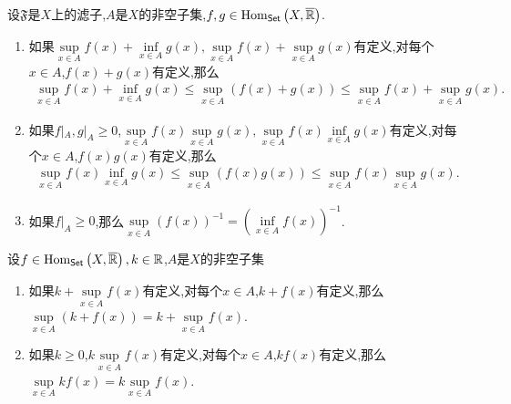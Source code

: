 \begin{proposition}{}{}
	设$\mathfrak{F}$是$X$上的滤子,$A$是$X$的非空子集,$f,g\in\operatorname{Hom}_{\mathsf{Set}}\left(X,\overline{\mathbb{R}}\right)$.
	\begin{enumerate}
		\item 如果$\sup\limits_{x\in A}f\left(x\right)+\inf\limits_{x\in A}g\left(x\right),\sup\limits_{x\in A}f\left(x\right)+\sup\limits_{x\in A}g\left(x\right)$有定义,对每个$x\in A$,$f\left(x\right)+g\left(x\right)$有定义,那么
		\begin{align*}
			\sup\limits_{x\in A}f\left(x\right)+\inf\limits_{x\in A}g\left(x\right)\leq\sup\limits_{x\in A}\left(f\left(x\right)+g\left(x\right)\right)\leq\sup\limits_{x\in A}f\left(x\right)+\sup\limits_{x\in A}g\left(x\right).
		\end{align*}
		\item 如果$f|_{A},g|_{A}\geq 0$,$\sup\limits_{x\in A}f\left(x\right)\sup\limits_{x\in A}g\left(x\right),\sup\limits_{x\in A}f\left(x\right)\inf\limits_{x\in A}g\left(x\right)$有定义,对每个$x\in A$,$f\left(x\right)g\left(x\right)$有定义,那么
		\begin{align*}
			\sup\limits_{x\in A}f\left(x\right)\inf\limits_{x\in A}g\left(x\right)\leq\sup\limits_{x\in A}\left(f\left(x\right)g\left(x\right)\right)\leq\sup\limits_{x\in A}f\left(x\right)\sup\limits_{x\in A}g\left(x\right).
		\end{align*}
		\item 如果$f|_{A}\geq 0$,那么$\sup\limits_{x\in A}\left(f\left(x\right)\right)^{-1}=\left(\inf\limits_{x\in A}f\left(x\right)\right)^{-1}$.
	\end{enumerate}
\end{proposition}

\begin{corollary}{}{}
	设$f\in\operatorname{Hom}_{\mathsf{Set}}\left(X,\overline{\mathbb{R}}\right),k\in\mathbb{R}$,$A$是$X$的非空子集
	\begin{enumerate}
		\item 如果$k+\sup\limits_{x\in A}f\left(x\right)$有定义,对每个$x\in A$,$k+f\left(x\right)$有定义,那么$\sup\limits_{x\in A}\left(k+f\left(x\right)\right)=k+\sup\limits_{x\in A}f\left(x\right)$.
		\item 如果$k\geq 0$,$k\sup\limits_{x\in A}f\left(x\right)$有定义,对每个$x\in A$,$kf\left(x\right)$有定义,那么$\sup\limits_{x\in A}kf\left(x\right)=k\sup\limits_{x\in A}f\left(x\right)$.
	\end{enumerate}
\end{corollary}

